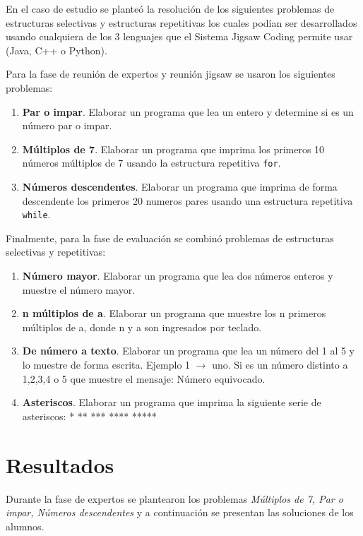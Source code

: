 \documentclass[twoside]{article}
\begin{document}
\begin{multicols}{2}
En el caso de estudio se planteó la resolución de los siguientes problemas de estructuras selectivas y estructuras repetitivas los cuales podían ser desarrollados usando cualquiera de los 3 lenguajes que el Sistema Jigsaw Coding permite usar (Java, C++ o Python).

Para la fase de reunión de expertos y reunión jigsaw se usaron los siguientes problemas:

\begin{enumerate}
	\item \textbf{Par o impar}. Elaborar un programa que lea un entero y determine si es un número par o impar.
	\item \textbf{Múltiplos de 7}. Elaborar un programa que imprima los primeros 10 números múltiplos de 7 usando la estructura repetitiva \texttt{for}.
	\item \textbf{Números descendentes}. Elaborar un programa que imprima de forma descendente los primeros 20 numeros pares usando una estructura repetitiva \texttt{while}.
\end{enumerate}

Finalmente, para la fase de evaluación se combinó problemas de estructuras selectivas y repetitivas:

\begin{enumerate}
	\item \textbf{Número mayor}. Elaborar un programa que lea dos números enteros y muestre el número mayor.
	\item \textbf{n múltiplos de a}. Elaborar un programa que muestre los n primeros múltiplos de a, donde n y a son ingresados por teclado.
	\item \textbf{De número a texto}. Elaborar un programa que lea un número del 1 al 5 y lo muestre de forma escrita. Ejemplo 1 $\longrightarrow$ uno. Si es un número distinto a 1,2,3,4 o 5 que muestre el mensaje: Número equivocado.
	\item \textbf{Asteriscos}. Elaborar un programa que imprima la siguiente serie de asteriscos: \newline 	
	\hbox{*} \newline
	\hbox{**} \newline
	\hbox{***} \newline
	\hbox{****} \newline
	\hbox{*****} 	
\end{enumerate}
\section{Resultados}
Durante la fase de expertos se plantearon los problemas \emph{Múltiplos de 7, Par o impar, Números descendentes} y a continuación se presentan las soluciones de los alumnos.


\end{multicols}
\end{document}
